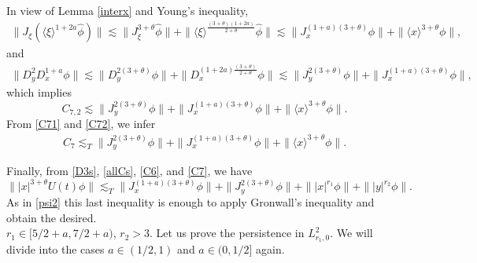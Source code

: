 \documentclass[reqno]{amsart}
\newcommand{\ha}{\hat{\phi}}
\newcommand{\lan}{\langle \xi \rangle}
\newcommand{\lanx}{\langle x \rangle}
\numberwithin{equation}{section}
\begin{document}
In view of Lemma \ref{interx} and Young's inequality, 
 \begin{equation*}
 \begin{split}
 \|J_\xi(\lan^{1+2a}\ha)\|\lesssim \|J_\xi^{3+\theta}\ha\|+\|\lan^{\frac{(3+\theta)(1+2a)}{2+\theta}}\ha\|\lesssim \|J_x^{(1+a)(3+\theta)}\phi\|+\|\lanx^{3+\theta}\phi\|,
 \end{split}
 \end{equation*}
 and
 \begin{equation*}
 \begin{split}
 \|D_y^2 D_x^{1+a}\phi\|\lesssim \|D_y^{2(3+\theta)}\phi\|+\|D_x^{(1+2a)\frac{(3+\theta)}{2+\theta}}\phi\|\lesssim \|J_y^{2(3+\theta)}\phi\|+\|J_x^{(1+a)(3+\theta)}\phi\|,
 \end{split}
 \end{equation*}
 which implies
 \begin{equation}\label{C72}
 C_{7,2}\lesssim \|J_y^{2(3+\theta)}\phi\|+\|J_x^{(1+a)(3+\theta)}\phi\|+\|\lanx^{3+\theta}\phi\|.
 \end{equation}
 From \eqref{C71} and \eqref{C72}, we infer
 \begin{equation}\label{C7}
 \begin{split}
 C_7\lesssim_{T} \|J_y^{2(3+\theta)}\phi\|+\|J_x^{(1+a)(3+\theta)}\phi\|+\|\lanx^{3+\theta}\phi\|.
 \end{split}
 \end{equation}

Finally, from \eqref{D3s}, \eqref{allCs}, \eqref{C6}, and \eqref{C7}, we have
$$
\||x|^{3+\theta}U(t)\phi\|\lesssim_{T} \|J_x^{(1+a)(3+\theta)}\phi\|+\|J_y^{2(3+\theta)}\phi\|+\||x|^{r_1}\phi\|+\||y|^{r_2}\phi\|.
$$
As in \eqref{psi2} this last inequality is enough to apply Gronwall's  inequality and obtain the desired.\\



 $r_1\in [5/2+a,7/2+a)$, $r_2>3$. Let us prove the persistence in $L^2_{r_1,0}$. We will divide into the cases $a\in(1/2,1)$ and $a\in(0,1/2]$ again.\\
\end{document}

